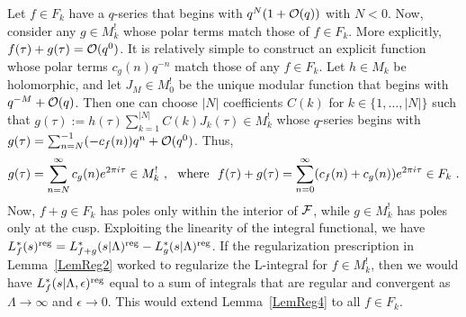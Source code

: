 \documentclass[11pt,a4paper]{article}
\newcommand{\e}{\epsilon}
\newcommand{\La}{\Lambda}
\newcommand{\reg}{{\rm reg}}
\begin{document}
Let $f \in F_k$ have a $q$-series that begins with $q^N (1 + {\cal O}(q))$ with $N < 0$. Now, consider any $g \in M_k^!$ whose polar terms match those of $f \in F_k$. More explicitly, $f(\tau) + g(\tau) = {\cal O}(q^0)$. It is relatively simple to construct an explicit function whose polar terms $c_g(n) q^{-n}$ match those of any $f \in F_k$. Let $h \in M_k$ be holomorphic, and let $J_M \in M_0^!$ be the unique modular function that begins with $q^{-M} + {\cal O}(q)$. Then one can choose $|N|$ coefficients $C(k)$ for $k \in \{ 1, \ldots, |N|\}$ such that $g(\tau):= h(\tau) \sum_{k = 1}^{|N|} C(k) J_k(\tau) \in M_k^!$ whose $q$-series begins with $g(\tau) = \sum_{n = N}^{-1} (-c_f(n))q^n + {\cal O}(q^0)$. Thus,
\begin{align}
g(\tau) = \sum_{n = N}^{\infty} c_g(n) e^{2 \pi i \tau} \in M_k^!~,~~{\rm where}~~
f(\tau) + g(\tau) = \sum_{n = 0}^{\infty} (c_f(n) + c_g(n)) e^{2 \pi i \tau} \in F_k~.
\end{align}
Now, $f+g \in F_k$ has poles only within the interior of ${\cal F}$, while $g \in M_k^!$ has poles only at the cusp. Exploiting the linearity of the integral functional, we have $L_f^*(s)^\reg = L_{f+g}^*(s|\La)^\reg - L_g^*(s|\La)^\reg$. If the regularization prescription in Lemma~\ref{LemReg2} worked to regularize the L-integral for $f \in M_k^!$, then we would have $L_f^*(s|\La,\e)^\reg$ equal to a sum of integrals that are regular and convergent as $\La \to \infty$ and $\e \to 0$. This would extend Lemma~\ref{LemReg4} to all $f \in F_k$. 
\end{document}
